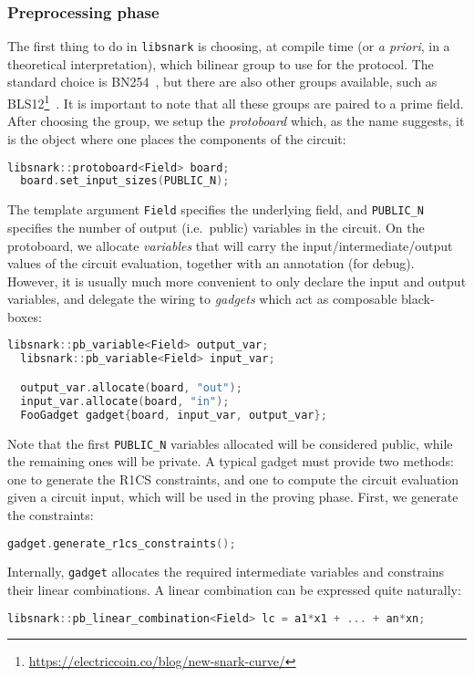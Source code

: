 \subsubsection*{Preprocessing phase}
The first thing to do in \texttt{libsnark} is choosing, at compile time (or \emph{a priori}, in a 
theoretical interpretation), which bilinear group to use for the protocol. 
The standard choice is BN254~\cite{BarretoN2005}, but there are also other groups available, such 
as BLS12\footnote{\url{https://electriccoin.co/blog/new-snark-curve/}}~\cite{BonehLS2001}.
It is important to note that all these groups are paired to a prime field.
After choosing the group, we setup the \emph{protoboard} which, as the 
name suggests, it is the object where one places the components of the circuit:
\begin{lstlisting}[language=C++]
  libsnark::protoboard<Field> board;
  board.set_input_sizes(PUBLIC_N);
\end{lstlisting}
The template argument \texttt{Field} specifies the underlying field, and \texttt{PUBLIC\_N} 
specifies the number of output (i.e.\ public) variables in the circuit.
On the protoboard, we allocate \emph{variables} that will carry the input/intermediate/output
values of the circuit evaluation, together with an annotation (for debug).
However, it is usually much more convenient to only declare the input and output variables, and 
delegate the wiring to \emph{gadgets} which act as composable black-boxes:
\begin{lstlisting}[language=C++]
  libsnark::pb_variable<Field> output_var;
  libsnark::pb_variable<Field> input_var;

  output_var.allocate(board, "out");
  input_var.allocate(board, "in");
  FooGadget gadget{board, input_var, output_var};
\end{lstlisting}
Note that the first \texttt{PUBLIC\_N} variables allocated will be considered public, while the 
remaining ones will be private.
A typical gadget must provide two methods: one to generate the R1CS constraints, and one to 
compute the circuit evaluation given a circuit input, which will be used in the proving phase.
First, we generate the constraints:
\begin{lstlisting}[language=C++]
  gadget.generate_r1cs_constraints();
\end{lstlisting}
Internally, \texttt{gadget} allocates the required intermediate variables and constrains their 
linear combinations. 
A linear combination can be expressed quite naturally:
\begin{lstlisting}[language=C++] 
  libsnark::pb_linear_combination<Field> lc = a1*x1 + ... + an*xn;
\end{lstlisting}
